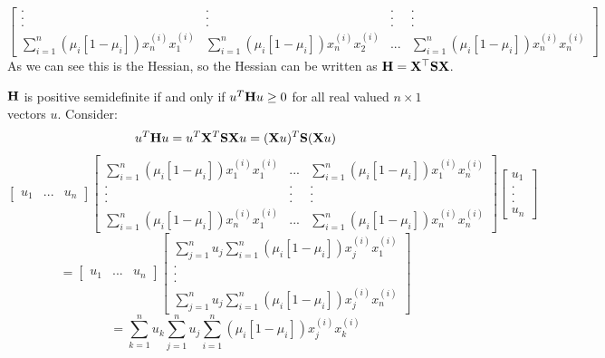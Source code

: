 \documentclass[12pt,letterpaper]{hmcpset}
\begin{document}
\begin{solution}
\begin{enumerate}[(a)]
$$\begin{bmatrix}
        .      &   .    &  .  &  .      \\[-10pt]
        .      &   .    &  .  &  .   \\[-10pt]
        .      &   .    &  .  &  .   \\[5pt]
        \sum_{i=1}^n (\mu_i[1-\mu_i])x_n^{(i)}x_1^{(i)} & \sum_{i=1}^n (\mu_i[1-\mu_i])x_n^{(i)}x_2^{(i)} & ... & \sum_{i=1}^n (\mu_i[1-\mu_i])x_n^{(i)}x_n^{(i)}
        \end{bmatrix}
	    $$
	    As we can see this is the Hessian, so the Hessian can be written as ${\bf H}={\bf X}^\top{\bf S}{\bf X}$. 
	    
	    \hspace{6mm} ${\bf H}$ is positive semidefinite if and only if $u^T{\bf H} u \geq 0$ for all real valued $n\times 1$ vectors $u$. Consider:
	    $$u^T{\bf H} u=u^T{\bf X}^T {\bf S} {\bf X} u = ({\bf X} u)^T {\bf S} ({\bf X} u)$$
	    $$
	    \begin{bmatrix}
	    u_1 & ... & u_n
	    \end{bmatrix}
	    \begin{bmatrix}
        \sum_{i=1}^n (\mu_i[1-\mu_i])x_1^{(i)}x_1^{(i)} & ... & \sum_{i=1}^n (\mu_i[1-\mu_i])x_1^{(i)}x_n^{(i)}  \\%
        .      &  .  &  .      \\[-10pt]
        .      &  .  &  .   \\[-10pt]
        .      &  .  &  .   \\[5pt]
        \sum_{i=1}^n (\mu_i[1-\mu_i])x_n^{(i)}x_1^{(i)} & ... & \sum_{i=1}^n (\mu_i[1-\mu_i])x_n^{(i)}x_n^{(i)}
        \end{bmatrix}
        \begin{bmatrix}
	    u_1 \\%
	    . \\[-10pt]
	    . \\[-10pt]
	    . \\[5pt]
	    u_n
	    \end{bmatrix}
	    $$
	    $$
	    = \begin{bmatrix}
	    u_1 & ... & u_n
	    \end{bmatrix}
	    \begin{bmatrix}
        \sum_{j=1}^n u_j \sum_{i=1}^n (\mu_i[1-\mu_i])x_j^{(i)}x_1^{(i)}  \\%
        .   \\[-10pt]
        .   \\[-10pt]
        .   \\[5pt]
        \sum_{j=1}^n u_j \sum_{i=1}^n (\mu_i[1-\mu_i])x_j^{(i)}x_n^{(i)}
        \end{bmatrix}
	    $$
	    $$ = \sum_{k=1}^n u_k \sum_{j=1}^n u_j \sum_{i=1}^n (\mu_i[1-\mu_i])x_j^{(i)}x_k^{(i)}
	    $$
	\end{enumerate}
\end{solution}
\newpage
\end{document}
